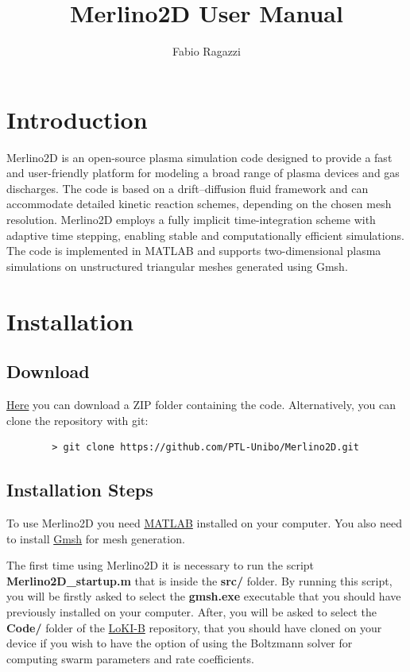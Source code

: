 \documentclass[12pt,a4paper]{article}
\title{\textbf{Merlino2D User Manual}}
\author{Fabio Ragazzi}
\date{}
\begin{document}
	
	\maketitle
	\tableofcontents
	\newpage
	
	\section{Introduction}
	
	Merlino2D is an open-source plasma simulation code designed to provide a fast and user-friendly platform for modeling a broad range of plasma devices and gas discharges. The code is based on a drift–diffusion fluid framework and can accommodate detailed kinetic reaction schemes, depending on the chosen mesh resolution. Merlino2D employs a fully implicit time-integration scheme with adaptive time stepping, enabling stable and computationally efficient simulations. The code is implemented in MATLAB and supports two-dimensional plasma simulations on unstructured triangular meshes generated using Gmsh.
	
	\section{Installation}
	
	\subsection{Download}
	\href{https://github.com/PTL-Unibo/Merlino2D}{Here} you can download a ZIP folder containing the code. Alternatively, you can clone the repository with git:
	\begin{verbatim}
		> git clone https://github.com/PTL-Unibo/Merlino2D.git
	\end{verbatim}
	
	\subsection{Installation Steps}
	To use Merlino2D you need \href{https://it.mathworks.com/}{MATLAB} installed on your computer.
	You also need to install \href{https://gmsh.info/}{Gmsh} for mesh generation.
	
	The first time using Merlino2D it is necessary to run the script \textbf{Merlino2D\_startup.m}
	that is inside the \textbf{src/} folder.
	By running this script, you will be firstly asked to select the \textbf{gmsh.exe} executable that you should have previously installed on your computer.
	After, you will be asked to select the \textbf{Code/} folder of the \href{https://github.com/LoKI-Suite/LoKI-B}{LoKI-B} repository, that you should have cloned on your device if you wish to have the option of using the Boltzmann solver for computing swarm parameters and rate coefficients.
	
\end{document}
